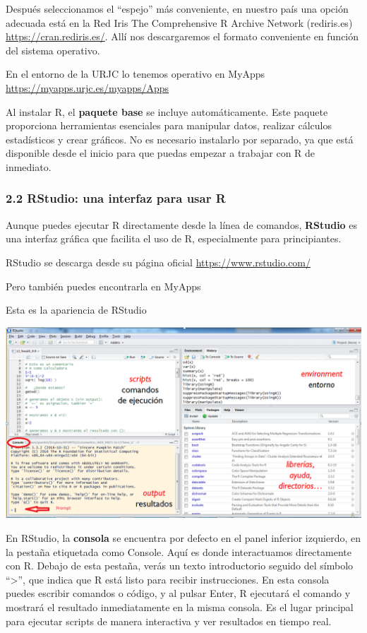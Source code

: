\documentclass[
  letterpaper,
  DIV=11,
  numbers=noendperiod]{scrartcl}
\begin{document}
Después seleccionamos el ``espejo'' más conveniente, en nuestro país una
opción adecuada está en la Red Iris The Comprehensive R Archive Network
(rediris.es) \url{https://cran.rediris.es/}. Allí nos descargaremos el
formato conveniente en función del sistema operativo.

En el entorno de la URJC lo tenemos operativo en MyApps
\url{https://myapps.urjc.es/myapps/Apps}

Al instalar R, el \textbf{paquete base} se incluye automáticamente. Este
paquete proporciona herramientas esenciales para manipular datos,
realizar cálculos estadísticos y crear gráficos. No es necesario
instalarlo por separado, ya que está disponible desde el inicio para que
puedas empezar a trabajar con R de inmediato.

\hypertarget{rstudio-una-interfaz-para-usar-r}{%
\subsubsection{2.2 RStudio: una interfaz para usar
R}\label{rstudio-una-interfaz-para-usar-r}}

Aunque puedes ejecutar R directamente desde la línea de comandos,
\textbf{RStudio} es una interfaz gráfica que facilita el uso de R,
especialmente para principiantes.

RStudio se descarga desde su página oficial
\url{https://www.rstudio.com/}

Pero también puedes encontrarla en MyApps

Esta es la apariencia de RStudio

\includegraphics{Imagenes/Rstudio_consola.png}

En RStudio, la \textbf{consola} se encuentra por defecto en el panel
inferior izquierdo, en la pestaña etiquetada como Console. Aquí es donde
interactuamos directamente con R. Debajo de esta pestaña, verás un texto
introductorio seguido del símbolo ``\textgreater{}'', que indica que R
está listo para recibir instrucciones. En esta consola puedes escribir
comandos o código, y al pulsar Enter, R ejecutará el comando y mostrará
el resultado inmediatamente en la misma consola. Es el lugar principal
para ejecutar scripts de manera interactiva y ver resultados en tiempo
real.
\end{document}
